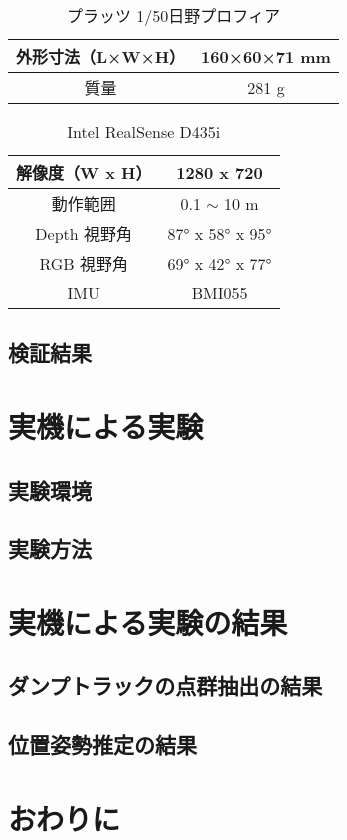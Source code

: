 \begin{table}[b]
    \begin{center}
    \caption{プラッツ 1/50日野プロフィア}
    \begin{tabular}{|c|c|}
    \hline
    外形寸法（L×W×H） & 160×60×71 mm \\ \hline
    質量          & 281 g        \\ \hline
    \end{tabular}
    \label{tab:truck}
    \end{center}
\end{table}

\begin{table}[b]
    \begin{center}
    \caption{Intel RealSense D435i}        
\begin{tabular}{|c|c|}
\hline
解像度（W x H）      & 1280 x 720               \\ \hline
動作範囲      & 0.1 $\sim$ 10 m            \\ \hline
Depth 視野角 & 87° x 58° x 95° \\ \hline
RGB 視野角   & 69° x 42° x 77°      \\ \hline
IMU       & BMI055                   \\ \hline
    \end{tabular}
    \label{tab:intel}
    \end{center}
\end{table}
\subsection{検証結果}
\section{実機による実験}
\subsection{実験環境}
\subsection{実験方法}
\section{実機による実験の結果}
\subsection{ダンプトラックの点群抽出の結果}
\subsection{位置姿勢推定の結果}
\section{おわりに}
